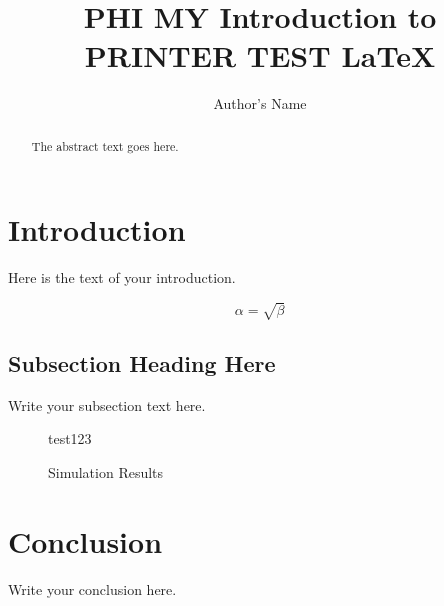 \documentclass{article}
\begin{document}
\title{PHI MY Introduction to PRINTER TEST \LaTeX{}}
\author{Author's Name}

\maketitle

\begin{abstract}
The abstract text goes here.
\end{abstract}

\section{Introduction}
Here is the text of your introduction.

\begin{equation}
    \label{simple_equation}
    \alpha = \sqrt{ \beta }
\end{equation}

\subsection{Subsection Heading Here}
Write your subsection text here.

\begin{figure}
    \centering
    test123
    \caption{Simulation Results}
    \label{simulationfigure}
\end{figure}

\section{Conclusion}
Write your conclusion here.
\end{document}
